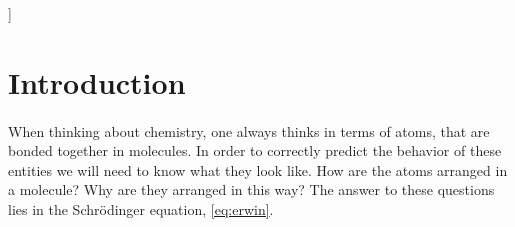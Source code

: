 \documentclass[twoside,twocolumn,9pt]{article}
\begin{document}
]

\renewcommand*\rmdefault{bch}\normalfont\upshape
\rmfamily
\section*{}
\vspace{-1cm}










\section{Introduction}

\paragraph*{}
When thinking about chemistry, one always thinks in terms of atoms, that are bonded together in molecules. In order to correctly predict the behavior of
these entities we will need to know what they look like. How are the atoms arranged in a molecule? Why are they arranged in this way? The answer to these
questions lies in the Schrödinger equation, \eqref{eq:erwin}.
\end{document}
